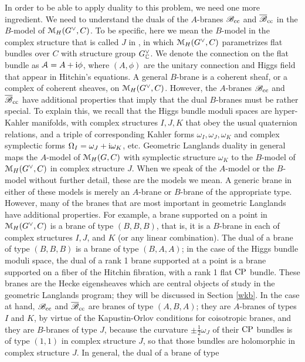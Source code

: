 \documentclass[11pt,a4paper]{article}
\begin{document}
In order to be able to apply duality to this problem, we need one more ingredient.   We need 
 to understand the duals of the $A$-branes ${\mathscr B}_{\mathrm{cc}}$ and ${\overline {\mathscr B}}_{\mathrm{cc}}$ in the $B$-model of ${\mathcal M}_H(G^\vee,C)$.    To be specific, here we mean
the  $B$-model in the
complex structure that is called $J$ in \cite{H}, in which ${\mathcal M}_H(G^\vee,C)$ parametrizes flat bundles over $C$ with structure group $G^\vee_{\mathbb C}$.   We denote
the  connection on the flat bundle as ${\mathcal A}=A+{\mathrm i}\phi$, where $(A,\phi)$ are the unitary connection and Higgs field that appear in Hitchin's equations.
A general $B$-brane is a coherent
sheaf, or a complex of coherent sheaves, on ${\mathcal M}_H(G^\vee,C)$.   
However, the $A$-branes ${\mathscr B}_{\mathrm{cc}}$ and ${\overline {\mathscr B}}_{\mathrm{cc}}$ have additional properties that imply that the dual $B$-branes must be rather special.
To explain this, we recall that the Higgs bundle moduli spaces are hyper-Kahler manifolds,
with complex structures $I,J,K$ that obey the usual quaternion relations, and a triple of corresponding Kahler forms $\omega_I,\omega_J,\omega_K$ and
complex symplectic forms $\Omega_I=\omega_J+{\mathrm i} \omega_K$, etc.   Geometric Langlands duality in general maps the $A$-model of ${\mathcal M}_H(G,C)$
with symplectic structure $\omega_K$ to the $B$-model of ${\mathcal M}_H(G^\vee,C)$ in complex structure $J$.   When we speak of the $A$-model or the $B$-model
without further detail, these are the models we mean.
A generic brane in either of these models is merely an $A$-brane or $B$-brane
of the appropriate type.   However, many of the branes that are most important in geometric Langlands have additional properties.   For example, a brane
supported on a point in ${\mathcal M}_H(G^\vee,C)$ is a brane of type $(B,B,B)$, that is, it is a $B$-brane in each of complex structures $I,J$, and $K$ (or any linear
combination).    The dual of a brane of type $(B,B,B)$ is a brane of type $(B,A,A)$; in the case of the Higgs bundle moduli space,
 the dual of a rank 1 brane supported at a point is a brane
supported on a fiber of the Hitchin fibration, with a rank 1 flat ${\mathrm{CP}}$ bundle.   These branes are the Hecke eigensheaves which are central objects of
study in the geometric Langlands program; they
 will be discussed in Section \ref{wkb}.   In the case at hand,
${\mathscr B}_{\mathrm{cc}}$ and ${\overline {\mathscr B}}_{\mathrm{cc}}$ are branes of type $(A,B,A)$; they are $A$-branes of types $I$ and $K$, by virtue of the Kapustin-Orlov conditions for
coisotropic branes, and they are $B$-branes of type $J$, because the curvature $\pm\frac{1}{2}\omega_J$ of their ${\mathrm{CP}}$ bundles is of type $(1,1)$
in complex structure $J$, so that those  bundles are holomorphic  in complex structure $J$.   In general, the dual of a brane of type
\end{document}

